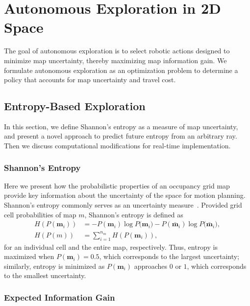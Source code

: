 
\chapter{Autonomous Exploration in 2D Space} \label{chap:ae2D}

The goal of autonomous exploration is to select robotic actions designed to minimize map uncertainty, thereby maximizing map information gain. We formulate autonomous exploration as an optimization problem to determine a policy that accounts for map uncertainty and travel cost.

\section{Entropy-Based Exploration}

In this section, we define Shannon's entropy as a measure of map uncertainty, and present a novel approach to predict future entropy from an arbitrary ray. Then we discuss computational modifications for real-time implementation.

\subsection{Shannon's Entropy}

Here we present how the probabilistic properties of an occupancy grid map provide key information about the uncertainty of the space for motion planning. Shannon's entropy commonly serves as an uncertainty measure~\cite{StaGriBur05}. Provided grid cell probabilities of map $m$, Shannon's entropy is defined as
\begin{align}
\label{eqn:ShannonsEntropyCell}
H(P(\mathbf{m}_i))&=-P(\mathbf{m}_i)\log{P(\mathbf{m}_i})-P(\bar{\mathbf{m}}_i)\log{P(\bar{\mathbf{m}}_i}),
\\
\label{eqn:ShannonsEntropyMap}
H(P(m))&=\sum_{i=1}^{n_m}H(P(\mathbf{m}_i)),
\end{align}
for an individual cell and the entire map, respectively.
Thus, entropy is maximized when $P(\mathbf{m}_i)=0.5$, which corresponds to the largest uncertainty; similarly, entropy is minimized as $P(\mathbf{m}_i)$ approaches $0$ or $1$, which corresponds to the smallest uncertainty. %



\subsection{Expected Information Gain}

